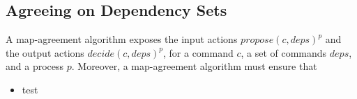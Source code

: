 \subsection{Agreeing on Dependency Sets}

A map-agreement algorithm exposes the input actions $propose\left( c, deps \right)^p$ and the output actions $decide\left( c, deps \right)^p$, for a command $c$, a set of commands $deps$, and a process $p$.
Moreover, a map-agreement algorithm must ensure that 
\begin{itemize}[noitemsep,nolistsep]
    \item test
\end{itemize}

\printbibliography%


